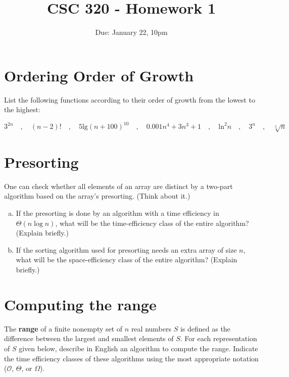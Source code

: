 \documentclass[12pt]{article}
\title{CSC 320 - Homework 1}
\author{}
\date{Due: January 22, 10pm}
\begin{document}
{\small \tableofcontents}




\section{Ordering Order of Growth}

List the following functions according to their order of growth from the lowest to the highest:

\[
    3^{2n} \quad,\quad  (n-2)!  \quad,\quad  5 \textrm{lg}(n+100)^{10}
    \quad,\quad  0.001n^4 + 3n^3 + 1    \quad,\quad      \textrm{ln}^2 n
    \quad,\quad     3^n    \quad,\quad    \sqrt[5]{n}
\]

\vspace{1in}


\section{Presorting}

One can check whether all elements of an array are distinct by a two-part algorithm based on the array's presorting. (Think about it.)

\begin{enumerate}[a.]
    \item If the presorting is done by an algorithm with a time efficiency in
    $\Theta(n \log n)$, what will be the time-efficiency class of the entire algorithm? (Explain briefly.)
    \vspace{1.1in}

    \item If the sorting algorithm used for presorting needs an extra array of size $n$, what will be the space-efficiency class of the entire algorithm? (Explain briefly.)
\end{enumerate}




\clearpage
\section{Computing the range}

The \textbf{range} of a finite nonempty set of $n$ real numbers $S$ is defined as the difference between the largest and smallest elements of $S$. For each representation of $S$ given below, describe in English an algorithm to compute the range. Indicate the time efficiency classes of these algorithms using the most appropriate notation ($\mathcal{O}$, $\Theta$, or $\Omega$).
\end{document}
